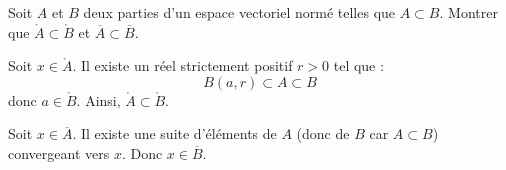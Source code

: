 \documentclass[a4paper,10pt]{report}
\begin{document}
\begin{Exa} Soit $A$ et $B$ deux parties d'un espace vectoriel normé telles que $A \subset B$. Montrer que $\mathring{A} \subset \mathring{B}$ et $\overline{A} \subset \overline{B}$.
\end{Exa}

\corr Soit $x \in \mathring{A}$. Il existe un réel strictement positif $r>0$ tel que :
$$ B(a,r) \subset A \subset B$$
donc $a \in  \mathring{B}$. Ainsi, $\mathring{A} \subset \mathring{B}$.

\medskip

\noindent Soit $x \in \overline{A}$. Il existe une suite d'éléments de $A$ (donc de $B$ car $A \subset B$) convergeant vers $x$. Donc $x \in \overline{B}$.

%
%
%  




%
%	
%	
%

%
\end{document}
